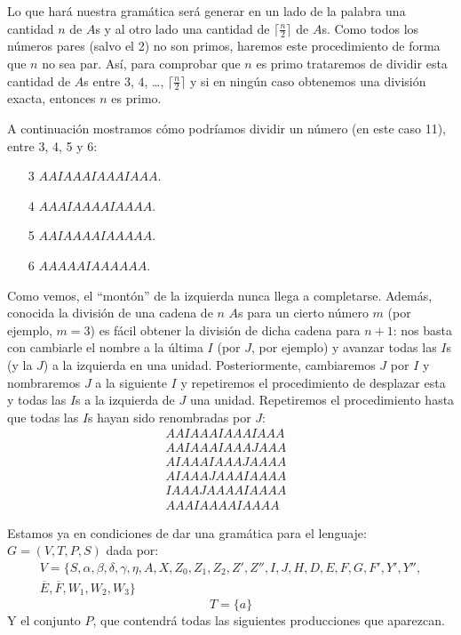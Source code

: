 \begin{ejercicio}
\begin{enumerate}
        Lo que hará nuestra gramática será generar en un lado de la palabra una cantidad $n$ de $A$s y al otro lado una cantidad de $\lceil\frac{n}{2}\rceil$ de $A$s. Como todos los números pares (salvo el 2) no son primos, haremos este procedimiento de forma que $n$ no sea par. Así, para comprobar que $n$ es primo trataremos de dividir esta cantidad de $A$s entre $3$, $4$, \ldots, $\lceil\frac{n}{2}\rceil$ y si en ningún caso obtenemos una división exacta, entonces $n$ es primo.
        \begin{ejemplo}
            A continuación mostramos cómo podríamos dividir un número (en este caso 11), entre 3, 4, 5 y 6:
            \begin{enumerate}
                \item[3] $AAIAAAIAAAIAAA$.
                \item[4] $AAAIAAAAIAAAA$.
                \item[5] $AAIAAAAIAAAAA$.
                \item[6] $AAAAAIAAAAAA$.
            \end{enumerate}
            Como vemos, el ``montón'' de la izquierda nunca llega a completarse. Además, conocida la división de una cadena de $n$ $A$s para un cierto número $m$ (por ejemplo, $m=3$) es fácil obtener la división de dicha cadena para $n+1$: nos basta con cambiarle el nombre a la última $I$ (por $J$, por ejemplo) y avanzar todas las $I$s (y la $J$) a la izquierda en una unidad. Posteriormente, cambiaremos $J$ por $I$ y nombraremos $J$ a la siguiente $I$ y repetiremos el procedimiento de desplazar esta y todas las $I$s a la izquierda de $J$ una unidad. Repetiremos el procedimiento hasta que todas las $I$s hayan sido renombradas por $J$:
            \begin{align*}
                AAIAAAIAAAIAAA& \\
                AAIAAAIAAAJAAA& \\
                AIAAAIAAAJAAAA& \\
                AIAAAJAAAIAAAA& \\
                IAAAJAAAAIAAAA& \\
                AAAIAAAAIAAAA& 
            \end{align*}
        \end{ejemplo}
        Estamos ya en condiciones de dar una gramática para el lenguaje: $G=(V,T,P,S)$ dada por:
        \begin{multline*}
            V = \{S, \alpha, \beta, \delta, \gamma, \eta, A, X, Z_0, Z_1, Z_2, Z', Z'', I, J, H, D, E, F, G, F', Y', Y'',\\ \overline{E}, \overline{F},W_1, W_2, W_3\}
        \end{multline*}
        \begin{equation*}
            T = \{a\}
        \end{equation*}
        Y el conjunto $P$, que contendrá todas las siguientes producciones que aparezcan.\\


\end{enumerate}
\end{ejercicio}
